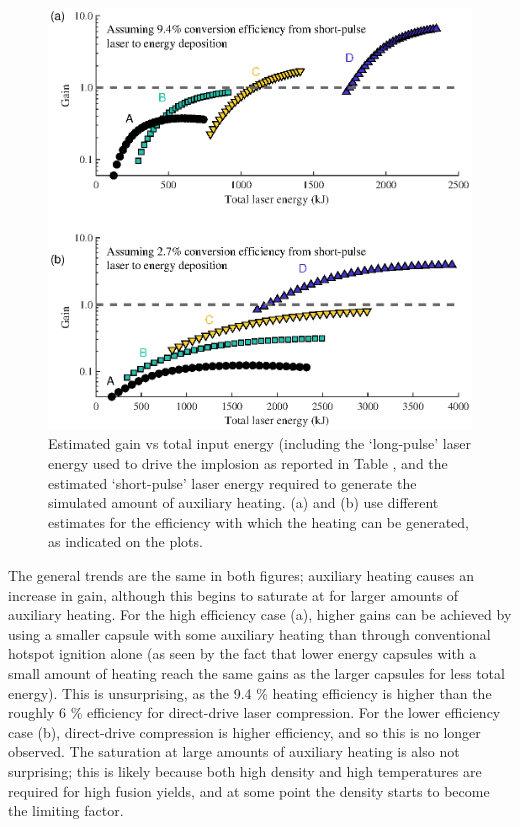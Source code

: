 \begin{figure}[ht]
\centering
\includegraphics{figures/FurtherSims/HeatingGain.eps}
\caption{Estimated gain vs total input energy (including the `long-pulse' laser energy used to drive the implosion as reported in Table \label{tab:Heating capsules}, and the estimated `short-pulse' laser energy required to generate the simulated amount of auxiliary heating. (a) and (b) use different estimates for the efficiency with which the heating can be generated, as indicated on the plots.}
\label{fig:HeatedGain}
\end{figure}

The general trends are the same in both figures; auxiliary heating causes an increase in gain, although this begins to saturate at for larger amounts of auxiliary heating. For the high efficiency case (a), higher gains can be achieved by using a smaller capsule with some auxiliary heating than through conventional hotspot ignition alone (as seen by the fact that lower energy capsules with a small amount of heating reach the same gains as the larger capsules for less total energy). This is unsurprising, as the 9.4 \% heating efficiency is higher than the roughly 6 \% efficiency for direct-drive laser compression. For the lower efficiency case (b), direct-drive compression is higher efficiency, and so this is no longer observed. The saturation at large amounts of auxiliary heating is also not surprising; this is likely because both high density and high temperatures are required for high fusion yields, and at some point the density starts to become the limiting factor.

